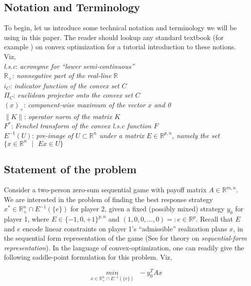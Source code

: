 \documentclass[a4paper,10pt,journal]{IEEEtran}
\begin{document}
\subsection{Notation and Terminology}
To begin, let us introduce some technical notation and terminology we will be using in this paper. The reader should lookup any standard textbook
(for example \cite{sboyd}) on convex optimization for a tutorial introduction to these notions. Viz,\\
\textit{l.s.c}: \quad \textit{acronyme for ``lower semi-continuous''}\\
$\mathbb{R}_+$: \quad \textit{nonnegative part of the real-line $\mathbb{R}$}\\
$i_C$: \quad \textit{indicator function of the convex set $C$}\\
$\Pi_C$: \quad \textit{euclidean projector onto the convex set $C$}\\
$(x)_+$: \quad \textit{component-wise maximum of the vector $x$ and 0}\\
$\|K\|$: \quad \textit{operator norm of the matrix $K$}\\
$F^*$: \quad \textit{Fenchel transform of the convex l.s.c function $F$}\\
$E^{-1}(U)$: \quad \textit{pre-image of $U \subset \mathbb{R}^n$ under a matrix $E \in \mathbb{R}^{p,n}$,
namely the set $\{x \in \mathbb{R}^n\text{ }| \text{ }Ex \in U\}$}

\subsection{Statement of the problem}
Consider a two-person zero-sum sequential game with payoff matrix $A \in \mathbb{R}^{m,n}$. We are interested in the problem of
finding the best response strategy $x^* \in \mathbb{R}_{+}^n \cap E^{-1}(\{e\})$ for player 2, given a fixed
(possibly mixed) strategy $y_0$ for player 1, where $E \in \{-1, 0, +1\}^{p,n}$ and $(1, 0, 0, ..., 0) =: e \in \mathbb{R}^p$.
Recall that $E$ and $e$ encode linear constraints on player 1's ``admissible'' realization plans $x$, in the sequential form representation
of the game (See \cite{bernhard-1996, benhard-agt} for theory on \textit{sequential-form representation}). In the language of convex-optimization,
one can readily give the following saddle-point formulation for this problem. Viz,

\begin{equation}
  \underset{x \in \mathbb{R}_{+}^n \cap E^{-1}(\{e\})}{min}\text{ }-y_0^TAx
\end{equation}
\end{document}
